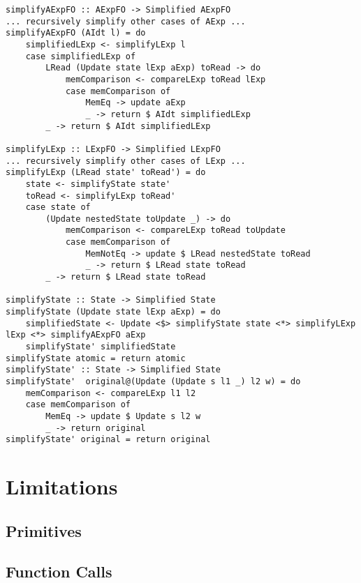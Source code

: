 \documentclass[12pt]{article}
\begin{document}
\begin{lstlisting}[style=c0, caption=implementation of the simplification rules, label=lst:simplification]
simplifyAExpFO :: AExpFO -> Simplified AExpFO
... recursively simplify other cases of AExp ...
simplifyAExpFO (AIdt l) = do
    simplifiedLExp <- simplifyLExp l
    case simplifiedLExp of 
        LRead (Update state lExp aExp) toRead -> do
            memComparison <- compareLExp toRead lExp
            case memComparison of
                MemEq -> update aExp
                _ -> return $ AIdt simplifiedLExp
        _ -> return $ AIdt simplifiedLExp

simplifyLExp :: LExpFO -> Simplified LExpFO
... recursively simplify other cases of LExp ...
simplifyLExp (LRead state' toRead') = do
    state <- simplifyState state'
    toRead <- simplifyLExp toRead'
    case state of 
        (Update nestedState toUpdate _) -> do
            memComparison <- compareLExp toRead toUpdate
            case memComparison of
                MemNotEq -> update $ LRead nestedState toRead 
                _ -> return $ LRead state toRead
        _ -> return $ LRead state toRead

simplifyState :: State -> Simplified State
simplifyState (Update state lExp aExp) = do
    simplifiedState <- Update <$> simplifyState state <*> simplifyLExp lExp <*> simplifyAExpFO aExp
    simplifyState' simplifiedState 
simplifyState atomic = return atomic    
simplifyState' :: State -> Simplified State
simplifyState'  original@(Update (Update s l1 _) l2 w) = do
    memComparison <- compareLExp l1 l2
    case memComparison of
        MemEq -> update $ Update s l2 w
        _ -> return original
simplifyState' original = return original
\end{lstlisting}

\section{Limitations}

\subsection{Primitives}
\label{primitives}

\subsection{Function Calls}
\label{funcalls}
\end{document}
